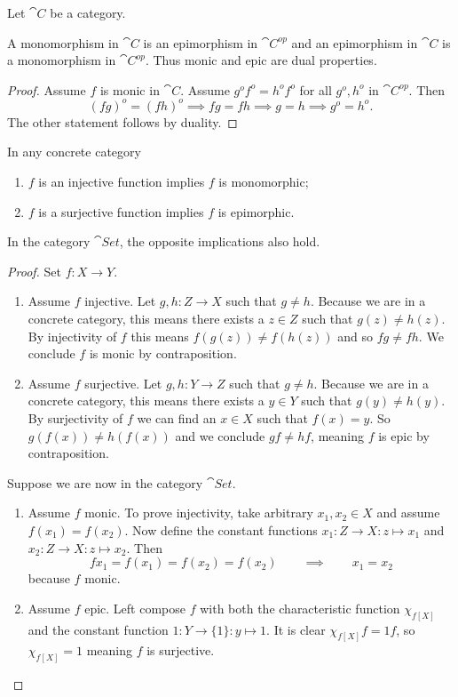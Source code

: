 \begin{lemma}
Let $\cat{C}$ be a category.

A monomorphism in $\cat{C}$ is an epimorphism in $\cat{C^{op}}$ and an epimorphism in $\cat{C}$ is a monomorphism in $\cat{C^{op}}$. Thus monic and epic are dual properties.
\end{lemma}
\begin{proof}
Assume $f$ is monic in $\cat{C}$. Assume $g^of^o = h^of^o$ for all $g^o, h^o$ in $\cat{C^{op}}$. Then
\[ (fg)^o = (fh)^o \implies fg = fh \implies g=h \implies g^o = h^o. \]
The other statement follows by duality.
\end{proof}

\begin{proposition} \label{prop:injectiveMonoSurjectiveEpi}
In any concrete category
\begin{enumerate}
\item $f$ is an injective function implies $f$ is monomorphic;
\item $f$ is a surjective function implies $f$ is epimorphic.
\end{enumerate}
In the category $\cat{Set}$, the opposite implications also hold.
\end{proposition}
\begin{proof}
Set $f:X\to Y$.
\begin{enumerate}
\item Assume $f$ injective. Let $g,h: Z\to X$ such that $g\neq h$. Because we are in a concrete category, this means there exists a $z\in Z$ such that $g(z) \neq h(z)$. By injectivity of $f$ this means $f(g(z)) \neq f(h(z))$ and so $fg \neq fh$. We conclude $f$ is monic by contraposition.
\item Assume $f$ surjective. Let $g,h: Y\to Z$ such that $g\neq h$. Because we are in a concrete category, this means there exists a $y\in Y$ such that $g(y) \neq h(y)$. By surjectivity of $f$ we can find an $x\in X$ such that $f(x) = y$. So $g(f(x)) \neq h(f(x))$ and we conclude $gf \neq hf$, meaning $f$ is epic by contraposition.
\end{enumerate}
Suppose we are now in the category $\cat{Set}$.
\begin{enumerate}
\item Assume $f$ monic. To prove injectivity, take arbitrary $x_1,x_2\in X$ and assume $f(x_1) = f(x_2)$. Now define the constant functions $x_1: Z\to X: z\mapsto x_1$ and $x_2: Z\to X: z\mapsto x_2$. Then
\[ fx_1 = f(x_1) = f(x_2) = f(x_2) \qquad \implies \qquad x_1 = x_2 \]
because $f$ monic.
\item Assume $f$ epic. Left compose $f$ with both the characteristic function $\chi_{f[X]}$ and the constant function $1: Y\to \{1\}: y\mapsto 1$. It is clear $\chi_{f[X]}f = 1f$, so $\chi_{f[X]} = 1$ meaning $f$ is surjective.
\end{enumerate}
\end{proof}

